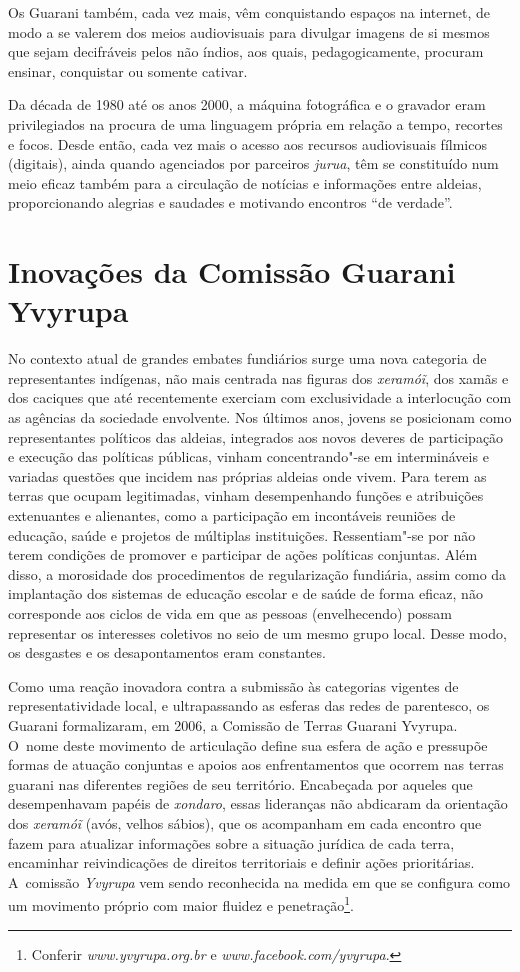 Os Guarani também, cada vez mais, vêm conquistando espaços na internet,
de modo a se valerem dos meios audiovisuais para divulgar imagens de si
mesmos que sejam decifráveis pelos não índios, aos quais,
pedagogicamente, procuram ensinar, conquistar ou somente cativar. 

Da década de 1980 até os anos 2000, a máquina fotográfica e o gravador
eram privilegiados na procura de uma linguagem própria em relação a
tempo, recortes e focos. Desde então, cada vez mais o acesso aos
recursos audiovisuais fílmicos (digitais), ainda quando agenciados por
parceiros \emph{jurua}, têm se constituído num meio eficaz também para a
circulação de notícias e informações entre aldeias, proporcionando
alegrias e saudades e motivando encontros ``de verdade''.

\section{Inovações da Comissão Guarani Yvyrupa}

No contexto atual de grandes embates fundiários surge uma nova categoria
de representantes indígenas, não mais centrada nas figuras dos
\emph{xeramóĩ}, dos xamãs e dos caciques que até
recentemente exerciam com exclusividade a interlocução com as agências
da sociedade envolvente. Nos últimos anos, jovens se posicionam como
representantes políticos das aldeias, integrados aos novos deveres de
participação e execução das políticas públicas, vinham concentrando"-se
em intermináveis e variadas questões que incidem nas próprias aldeias
onde vivem. Para terem as terras que ocupam legitimadas, vinham
desempenhando funções e atribuições extenuantes e alienantes, como a
participação em incontáveis reuniões de educação, saúde e projetos de
múltiplas instituições. Ressentiam"-se por não terem condições de
promover e participar de ações políticas conjuntas. Além disso, a
morosidade dos procedimentos de regularização fundiária, assim como da
implantação dos sistemas de educação escolar e de saúde de forma
eficaz, não corresponde aos ciclos de vida em que as pessoas
(envelhecendo) possam representar os interesses coletivos no seio de um
mesmo grupo local. Desse modo, os desgastes e os desapontamentos eram
constantes. 

Como uma reação inovadora contra a submissão às categorias vigentes de
representatividade local, e ultrapassando as esferas das redes de
parentesco, os Guarani formalizaram, em 2006, a Comissão de Terras
Guarani Yvyrupa. O~nome deste movimento de articulação define sua
esfera de ação e pressupõe formas de atuação conjuntas e apoios aos
enfrentamentos que ocorrem nas terras guarani nas diferentes regiões de
seu território. Encabeçada por aqueles que desempenhavam papéis de
\emph{xondaro}, essas lideranças não abdicaram da orientação dos
\emph{xeramóĩ} (avós, velhos sábios), que os acompanham
em cada encontro que fazem para atualizar informações sobre a situação
jurídica de cada terra, encaminhar reivindicações de direitos
territoriais e definir ações prioritárias. A~comissão \emph{Yvyrupa} vem sendo
reconhecida na medida em que se configura como um movimento próprio com
maior fluidez e penetração\footnote{Conferir \emph{www.yvyrupa.org.br} e
\emph{www.facebook.com/yvyrupa}.}. 

